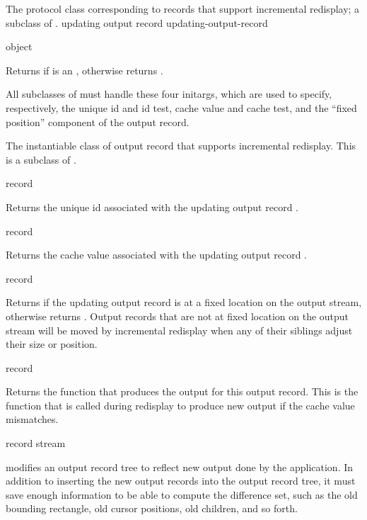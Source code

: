 
The protocol class corresponding to records that support incremental redisplay;
a subclass of .
 {updating output record} {updating-output-record}

 {object}

Returns  if  is an ,
otherwise returns .


All subclasses of  must handle these four initargs,
which are used to specify, respectively, the unique id and id test, cache value
and cache test, and the ``fixed position'' component of the output record.


The instantiable class of output record that supports incremental redisplay.
This is a subclass of .


 {record}

Returns the unique id associated with the updating output record .

 {record}

Returns the cache value associated with the updating output record .

 {record}

Returns  if the updating output record  is at a fixed
location on the output stream, otherwise returns .  Output records
that are not at fixed location on the output stream will be moved by incremental
redisplay when any of their siblings adjust their size or position.

 {record}

Returns the function that produces the output for this output record.  This is
the function that is called during redisplay to produce new output if the cache
value mismatches.


 {record stream}

 modifies an output record tree to reflect new
output done by the application.  In addition to inserting the new output records
into the output record tree, it must save enough information to be able to
compute the difference set, such as the old bounding rectangle, old cursor
positions, old children, and so forth.

